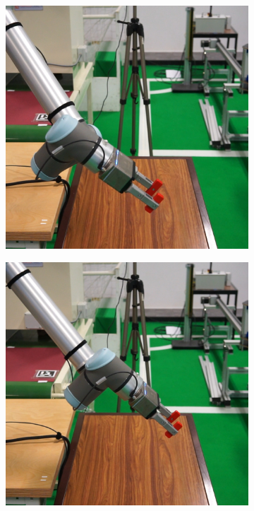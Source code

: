 \begin{figure}[h]
    \centering
    \begin{subfigure}{.2\linewidth}
        \centering
        \includegraphics[width=.95\linewidth]{figs/chp6/col_real_no_1.jpg}
    \end{subfigure}%
    \begin{subfigure}{.2\linewidth}
        \centering
        \includegraphics[width=.95\linewidth]{figs/chp6/col_real_no_2.jpg}

\end{subfigure}
\end{figure}
